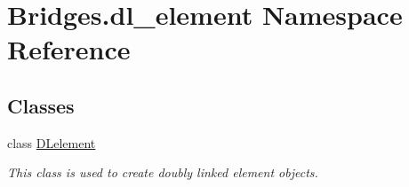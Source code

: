 \hypertarget{namespace_bridges_1_1dl__element}{}\section{Bridges.\+dl\+\_\+element Namespace Reference}
\label{namespace_bridges_1_1dl__element}
\subsection*{Classes}
\begin{DoxyCompactItemize}
\item 
class \hyperlink{class_bridges_1_1dl__element_1_1_d_lelement}{D\+Lelement}
\begin{DoxyCompactList}\small\item\em This class is used to create doubly linked element objects. \end{DoxyCompactList}\end{DoxyCompactItemize}

